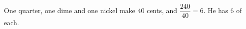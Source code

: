One quarter, one dime and one nickel make $40$ cents, and $\dfrac{240}{40}=6$. He has $\boxed{6}$ of each.
